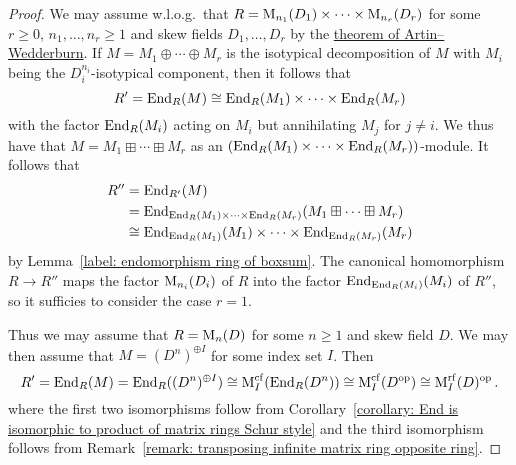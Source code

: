\begin{proof}
  We may assume w.l.o.g.\ that $R = \operatorname{M}_{n_1}(D_1) \times \dotsb \times \operatorname{M}_{n_r}(D_r)$ for some $r \geq 0$, $n_1, \dotsc, n_r \geq 1$ and skew fields $D_1, \dotsc, D_r$ by the \hyperref[theorem: artin wedderburn theorem]{theorem of Artin--Wedderburn}.
  If $M = M_1 \oplus \dotsb \oplus M_r$ is the isotypical decomposition of $M$ with $M_i$ being the $D_i^{n_i}$-isotypical component, then it follows that
  \[
          R'
    =     \operatorname{End}_R(M)
    \cong \operatorname{End}_R(M_1) \times \dotsb \times \operatorname{End}_R(M_r)
  \]
  with the factor $\operatorname{End}_R(M_i)$ acting on $M_i$ but annihilating $M_j$ for $j \neq i$.
  We thus have that $M = M_1 \boxplus \dotsb \boxplus M_r$ as an $(\operatorname{End}_R(M_1) \times \dotsb \times \operatorname{End}_R(M_r))$-module.
  It follows that
  \begin{align*}
            R''
    &=      \operatorname{End}_{R'}(M)  \\
    &=      \operatorname{End}_{\operatorname{End}_R(M_1) \times \dotsb \times \operatorname{End}_R(M_r)}(M_1 \boxplus \dotsb \boxplus M_r) \\
    &\cong  \operatorname{End}_{\operatorname{End}_R(M_1)}(M_1) \times \dotsb \times \operatorname{End}_{\operatorname{End}_R(M_r)}(M_r)
  \end{align*}
  by Lemma~\ref{label: endomorphism ring of boxsum}.
  The canonical homomorphism $R \to R''$ maps the factor $\operatorname{M}_{n_i}(D_i)$ of $R$ into the factor $\operatorname{End}_{\operatorname{End}_R(M_i)}(M_i)$ of $R''$, so it sufficies to consider the case $r = 1$.
  
  Thus we may assume that $R = \operatorname{M}_n(D)$ for some $n \geq 1$ and skew field $D$.
  We may then assume that $M = (D^n)^{\oplus I}$ for some index set $I$.
  Then
  \[
          R'
    =     \operatorname{End}_R(M)
    =     \operatorname{End}_R( (D^n)^{\oplus I} )
    \cong \operatorname{M}_I^{{\operatorname{cf}}}( \operatorname{End}_R( D^n ) )
    \cong \operatorname{M}_I^{{\operatorname{cf}}}( D^{\operatorname{op}} )
    \cong \operatorname{M}_I^{{\operatorname{rf}}}( D )^{\operatorname{op}} \,.
  \]
  where the first two isomorphisms follow from Corollary~\ref{corollary: End is isomorphic to product of matrix rings Schur style} and the third isomorphism follows from Remark~\ref{remark: transposing infinite matrix ring opposite ring}.
  

\end{proof}
